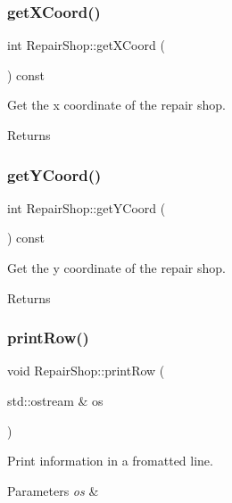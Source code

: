 \subsubsection{\texorpdfstring{get\+X\+Coord()}{getXCoord()}}
{\footnotesize\ttfamily int Repair\+Shop\+::get\+X\+Coord (\begin{DoxyParamCaption}{ }\end{DoxyParamCaption}) const}

Get the x coordinate of the repair shop.

\begin{DoxyReturn}{Returns}

\end{DoxyReturn}
\mbox{\label{classRepairShop_a9c3c6369451f7da751ca1c6845d5d8f7}} 
\subsubsection{\texorpdfstring{get\+Y\+Coord()}{getYCoord()}}
{\footnotesize\ttfamily int Repair\+Shop\+::get\+Y\+Coord (\begin{DoxyParamCaption}{ }\end{DoxyParamCaption}) const}

Get the y coordinate of the repair shop.

\begin{DoxyReturn}{Returns}

\end{DoxyReturn}
\mbox{\label{classRepairShop_a7da5258b6595d1efc533b1eb8ec41ce3}} 
\subsubsection{\texorpdfstring{print\+Row()}{printRow()}}
{\footnotesize\ttfamily void Repair\+Shop\+::print\+Row (\begin{DoxyParamCaption}\item[{std\+::ostream \&}]{os }\end{DoxyParamCaption})}

Print information in a fromatted line.


\begin{DoxyParams}{Parameters}
{\em os} & \\
\hline
\end{DoxyParams}
\mbox{\label{classRepairShop_adb1e3f82716bac189d0f91ce9b9fd74e}} 
